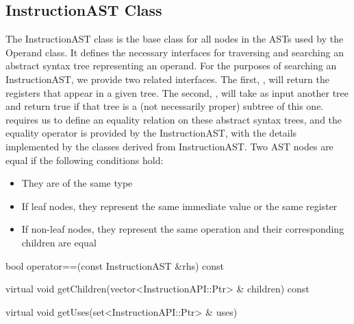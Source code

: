 \subsection{InstructionAST Class}
\label{sec:instructionAST}

The InstructionAST class is the base class for all nodes in the ASTs used by the
Operand class. It defines the necessary interfaces for traversing and searching
an abstract syntax tree representing an operand. For the purposes of searching
an InstructionAST, we provide two related interfaces. The first, ,
will return the registers that appear in a given tree. The second,
, will take as input another tree and return true if that tree is a
(not necessarily proper) subtree of this one.  requires us to
define an equality relation on these abstract syntax trees, and the equality
operator is provided by the InstructionAST, with the details implemented by the
classes derived from InstructionAST. Two AST nodes are equal if the following
conditions hold:

\begin{itemize}
\item They are of the same type
\item If leaf nodes, they represent the same immediate value or the same register
\item If non-\/leaf nodes, they represent the same operation and their corresponding children are equal 
\end{itemize}

\begin{apient}
bool operator==(const InstructionAST &rhs) const  
\end{apient}

\begin{apient}
virtual void getChildren(vector<InstructionAPI::Ptr> & children) const
\end{apient}

\begin{apient}
virtual void getUses(set<InstructionAPI::Ptr> & uses)
\end{apient}

